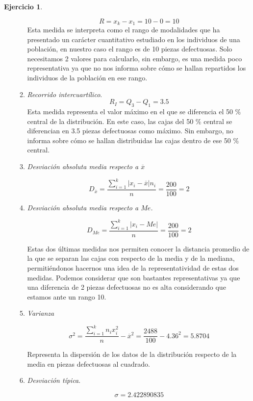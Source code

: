 \documentclass[a4paper, 12pt]{article}
\providecommand{\abs}[1]{\lvert#1\rvert}
\theoremstyle{definition}
\newtheorem{ej}{Ejercicio}
\begin{document}
\begin{ej}
\begin{enumerate}[label=\textit{\alph*)}]
\begin{enumerate}[label=\arabic*)]
        \[
        R = x_k - x_1 = 10 - 0 = 10
        \]
        Esta medida se interpreta como el rango de modalidades que ha presentado un carácter cuantitativo estudiado en los individuos de una población, en nuestro caso el rango es de 10 piezas defectuosas. Solo necesitamos 2 valores para calcularlo, sin embargo, es una medida poco representativa ya que no nos informa sobre cómo se hallan repartidos los individuos de la población en ese rango.
        \item \textit{Recorrido intercuartílico}.
        \[
        R_I = Q_3 - Q_1 = 3.5
        \]
        Esta medida representa el valor máximo en el que se diferencia el 50 \% central de la distribución. En este caso, las cajas del 50 \% central se diferencian en 3.5 piezas defectuosas como máximo. Sin embargo, no informa sobre cómo se hallan distribuidas las cajas dentro de ese 50 \% central.
        \item \textit{Desviación absoluta media respecto a \(\overline{x}\)}
        
        \[
        D_{\overline{x}} = \frac{\sum_{i=1}^{k}\abs{x_i-\overline{x}}n_i}{n} = \frac{200}{100} = 2
        \]
        
        \item \textit{Desviación absoluta media respecto a \(Me\).}
        
        \[
        D_{Me} = \frac{\sum_{i=1}^{k}\abs{x_i-Me}}{n} = \frac{200}{100} = 2
        \]
        
        Estas dos últimas medidas nos permiten conocer la distancia promedio de la que se separan las cajas con respecto de la media y de la mediana, permitiéndonos hacernos una idea de la representatividad de estas dos medidas. Podemos considerar que son bastantes representativas ya que una diferencia de 2 piezas defectuosas no es alta considerando que estamos ante un rango 10.
        
        \item \textit{Varianza}
        
        \[
        \sigma^2 = \frac{\sum_{i=1}^{k}n_ix_i^2}{n} - \overline{x}^2 = \frac{2488}{100} - 4.36^2 = 5.8704
        \]
        
        Representa la dispersión de los datos de la distribución respecto de la media en piezas defectuosas al cuadrado.
        
        \item \textit{Desviación típica}.
        
        \[
        \sigma = 2.422890835
        \]
        

\end{enumerate}
\end{enumerate}
\end{ej}
\end{document}
